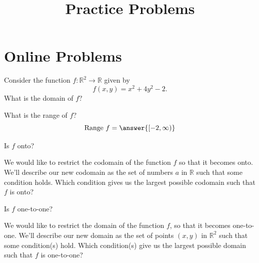 \documentclass{ximera}
\title{Practice Problems}
\begin{document}
\begin{abstract}
\end{abstract}
\maketitle
\section{Online Problems}
\begin{problem}
Consider the function $f:\mathbb{R}^2\rightarrow\mathbb{R}$ given by
\[
f(x,y) = x^2+4y^2 -2.
\]
What is the domain of $f$?
\begin{multipleChoice}
\choice{$[0,\infty)$}
\end{multipleChoice}

What is the range of $f$?
\[
\textrm{Range }f = \answer{[-2,\infty)}
\]

Is $f$ onto?
\begin{multipleChoice}
\end{multipleChoice}

\begin{problem}
We would like to restrict the codomain of the function $f$ so that it becomes onto. We'll describe our new codomain as the set of numbers $a$ in $\mathbb{R}$ such that some condition holds. Which condition gives us the largest possible codomain such that $f$ is onto?
\begin{multipleChoice}
\end{multipleChoice}
\end{problem}

Is $f$ one-to-one?
\begin{multipleChoice}
\end{multipleChoice}

\begin{problem}
We would like to restrict the domain of the function $f$, so that it becomes one-to-one. We'll describe our new domain as the set of points $(x,y)$ in $\mathbb{R}^2$ such that some condition(s) hold. Which condition(s) give us the largest possible domain such that $f$ is one-to-one?
\begin{selectAll}
\end{selectAll}
\end{problem}
\end{problem}
\end{document}
